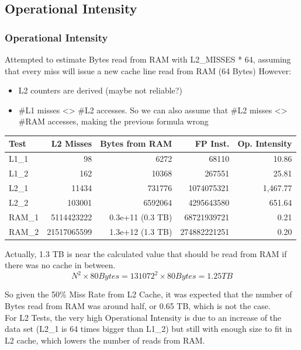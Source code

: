 \documentclass{beamer}
\begin{document}
\subsection{Operational Intensity}
\begin{frame}
	\frametitle{Operational Intensity}

	Attempted to estimate Bytes read from RAM with L2\_MISSES * 64, assuming that every miss will issue a new cache line read from RAM (64 Bytes)
	However:
	\begin{itemize}
		\item L2 counters are derived (maybe not reliable?)
		\item \#L1 misses <> \#L2 accesses. So we can also assume that \#L2 misses <> \#RAM accesses, making the previous formula wrong
	\end{itemize}

	\begin{table}[!htp]
		\begin{center}
		{\small
			\begin{tabular}{|l|r|r|r|r|}
				\hline
				Test	&	L2 Misses		&	Bytes from RAM		&	FP Inst.		&	Op. Intensity	\\
				\hline
				L1\_1	&	98				&	6272				&	68110			&	10.86			\\
				L1\_2	&	162				&	10368				&	267551			&	25.81			\\
				L2\_1	&	11434			&	731776				&	1074075321		&	1,467.77		\\
				L2\_2	&	103001			&	6592064				&	4295643580		&	651.64			\\
				RAM\_1	&	5114423222		&	0.3e+11 (0.3 TB)	&	68721939721		&	0.21			\\
				RAM\_2	&	21517065599		&	1.3e+12 (1.3 TB)	&	274882221251	&	0.20			\\
				\hline
			\end{tabular}
		}
		\end{center}
	\end{table}

	Actually, 1.3 TB is near the calculated value that should be read from RAM if there was no cache in between.\\
	$$N^{2} \times 80 Bytes = 131072^{2} \times 80 Bytes = 1.25 TB$$

	So given the 50\% Miss Rate from L2 Cache, it was expected that the number of Bytes read from RAM was around half, or 0.65 TB, which is not the case.\\

		For L2 Tests, the very high Operational Intensity is due to an increase of the data set (L2\_1 is 64 times bigger than L1\_2) but still with enough size to fit in L2 cache, which lowers the number of reads from RAM.

\end{frame}
\end{document}
